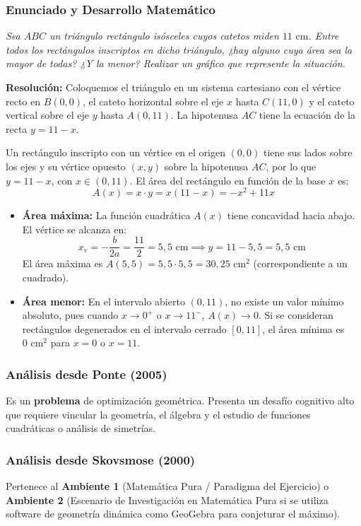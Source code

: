 \documentclass[11pt,a4paper]{article}
\begin{document}
\subsubsection{Enunciado y Desarrollo Matemático}
\textit{Sea $ABC$ un triángulo rectángulo isósceles cuyos catetos miden $11\text{ cm}$. Entre todos los rectángulos inscriptos en dicho triángulo, ¿hay alguno cuya área sea la mayor de todas? ¿Y la menor? Realizar un gráfico que represente la situación.}

\textbf{Resolución:}
Coloquemos el triángulo en un sistema cartesiano con el vértice recto en $B(0,0)$, el cateto horizontal sobre el eje $x$ hasta $C(11,0)$ y el cateto vertical sobre el eje $y$ hasta $A(0,11)$.
La hipotenusa $AC$ tiene la ecuación de la recta $y = 11 - x$.

Un rectángulo inscripto con un vértice en el origen $(0,0)$ tiene sus lados sobre los ejes y su vértice opuesto $(x, y)$ sobre la hipotenusa $AC$, por lo que $y = 11 - x$, con $x \in (0, 11)$.
El área del rectángulo en función de la base $x$ es:
\[
A(x) = x \cdot y = x(11 - x) = -x^2 + 11x
\]
\begin{itemize}
    \item \textbf{Área máxima:} La función cuadrática $A(x)$ tiene concavidad hacia abajo. El vértice se alcanza en:
    \[
    x_v = -\frac{b}{2a} = \frac{11}{2} = 5{,}5\text{ cm} \implies y = 11 - 5{,}5 = 5{,}5\text{ cm}
    \]
    El área máxima es $A(5{,}5) = 5{,}5 \cdot 5{,}5 = 30{,}25\text{ cm}^2$ (correspondiente a un cuadrado).
    \item \textbf{Área menor:} En el intervalo abierto $(0, 11)$, no existe un valor mínimo absoluto, pues cuando $x \to 0^+$ o $x \to 11^-$, $A(x) \to 0$. Si se consideran rectángulos degenerados en el intervalo cerrado $[0, 11]$, el área mínima es $0\text{ cm}^2$ para $x=0$ o $x=11$.
\end{itemize}

\subsubsection{Análisis desde Ponte (2005)}
Es un \textbf{problema} de optimización geométrica. Presenta un desafío cognitivo alto que requiere vincular la geometría, el álgebra y el estudio de funciones cuadráticas o análisis de simetrías.

\subsubsection{Análisis desde Skovsmose (2000)}
Pertenece al \textbf{Ambiente 1} (Matemática Pura / Paradigma del Ejercicio) o \textbf{Ambiente 2} (Escenario de Investigación en Matemática Pura si se utiliza software de geometría dinámica como GeoGebra para conjeturar el máximo).
\end{document}
